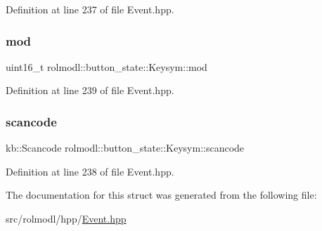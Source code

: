 Definition at line 237 of file Event.\+hpp.

\mbox{\label{structrolmodl_1_1button__state_1_1_keysym_a4a10ef140948224bdf74daca79251446}} 
\subsubsection{\texorpdfstring{mod}{mod}}
{\footnotesize\ttfamily uint16\+\_\+t rolmodl\+::button\+\_\+state\+::\+Keysym\+::mod}



Definition at line 239 of file Event.\+hpp.

\mbox{\label{structrolmodl_1_1button__state_1_1_keysym_a376dfa81769a2583d381ca795f75472a}} 
\subsubsection{\texorpdfstring{scancode}{scancode}}
{\footnotesize\ttfamily kb\+::\+Scancode rolmodl\+::button\+\_\+state\+::\+Keysym\+::scancode}



Definition at line 238 of file Event.\+hpp.



The documentation for this struct was generated from the following file\+:\begin{DoxyCompactItemize}
\item 
src/rolmodl/hpp/\mbox{\hyperlink{_event_8hpp}{Event.\+hpp}}\end{DoxyCompactItemize}
